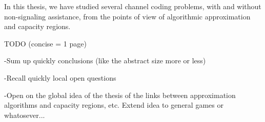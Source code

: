 In this thesis, we have studied several channel coding problems, with and without non-signaling assistance, from the points of view of algorithmic approximation and  capacity regions.

TODO (concise = 1 page)

-Sum up quickly conclusions (like the abstract size more or less)

-Recall quickly local open questions

-Open on the global idea of the thesis of the links between approximation algorithms and capacity regions, etc. Extend idea to general games or whatosever...
